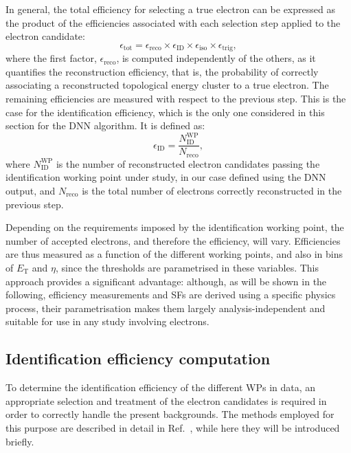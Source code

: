 In general, the total efficiency for selecting a true electron can be expressed as the product of the efficiencies associated with each selection step applied to the electron candidate:
\begin{equation}
  \epsilon_{\text{tot}} = \epsilon_{\text{reco}} \times \epsilon_{\text{ID}} \times \epsilon_{\text{iso}} \times \epsilon_{\text{trig}},
\end{equation}
where the first factor, $\epsilon_{\text{reco}}$, is computed independently of the others, as it quantifies the reconstruction efficiency, that is, the probability of correctly associating a reconstructed topological energy cluster to a true electron. The remaining efficiencies are measured with respect to the previous step. This is the case for the identification efficiency, which is the only one considered in this section for the DNN algorithm. It is defined as:
\begin{equation}
  \epsilon_{\text{ID}} = \frac{N^{\text{WP}}_{\text{ID}}}{N_{\text{reco}}},
\label{eq:id_eff}  
\end{equation}
where $N^{\text{WP}}_{\text{ID}}$ is the number of reconstructed electron candidates passing the identification working point under study, in our case defined using the DNN output, and $N_{\text{reco}}$ is the total number of electrons correctly reconstructed in the previous step.

Depending on the requirements imposed by the identification working point, the number of accepted electrons, and therefore the efficiency, will vary. Efficiencies are thus measured as a function of the different working points, and also in bins of $E_{\text{T}}$ and $\eta$, since the thresholds are parametrised in these variables. This approach provides a significant advantage: although, as will be shown in the following, efficiency measurements and SFs are derived using a specific physics process, their parametrisation makes them largely analysis-independent and suitable for use in any study involving electrons.

\subsection{Identification efficiency computation}
To determine the identification efficiency of the different WPs in data, an appropriate selection and treatment of the electron candidates is required in order to correctly handle the present backgrounds. The methods employed for this purpose are described in detail in Ref.~\cite{latest_electron_paper_2024}, while here they will be introduced briefly.


